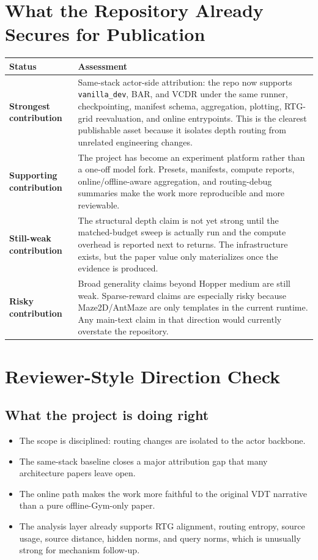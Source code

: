 \documentclass[11pt]{article}
\newcommand{\vdt}{\textsc{VDT}}
\newcommand{\vanilla}{\texttt{vanilla\_dev}}
\begin{document}
\section{What the Repository Already Secures for Publication}

\begin{tabularx}{\textwidth}{>{\raggedright\arraybackslash}p{}X}
\toprule
\textbf{Status} & \textbf{Assessment} \\
\midrule
\textbf{Strongest contribution} & Same-stack actor-side attribution: the repo now supports \vanilla{}, BAR, and VCDR under the same runner, checkpointing, manifest schema, aggregation, plotting, RTG-grid reevaluation, and online entrypoints. This is the clearest publishable asset because it isolates depth routing from unrelated engineering changes. \\
\textbf{Supporting contribution} & The project has become an experiment platform rather than a one-off model fork. Presets, manifests, compute reports, online/offline-aware aggregation, and routing-debug summaries make the work more reproducible and more reviewable. \\
\textbf{Still-weak contribution} & The structural depth claim is not yet strong until the matched-budget sweep is actually run and the compute overhead is reported next to returns. The infrastructure exists, but the paper value only materializes once the evidence is produced. \\
\textbf{Risky contribution} & Broad generality claims beyond Hopper medium are still weak. Sparse-reward claims are especially risky because Maze2D/AntMaze are only templates in the current runtime. Any main-text claim in that direction would currently overstate the repository. \\
\bottomrule
\end{tabularx}

\section{Reviewer-Style Direction Check}

\subsection{What the project is doing right}

\begin{itemize}
  \item The scope is disciplined: routing changes are isolated to the actor backbone.
  \item The same-stack baseline closes a major attribution gap that many architecture papers leave open.
  \item The online path makes the work more faithful to the original \vdt{} narrative than a pure offline-Gym-only paper.
  \item The analysis layer already supports RTG alignment, routing entropy, source usage, source distance, hidden norms, and query norms, which is unusually strong for mechanism follow-up.
\end{itemize}
\end{document}
